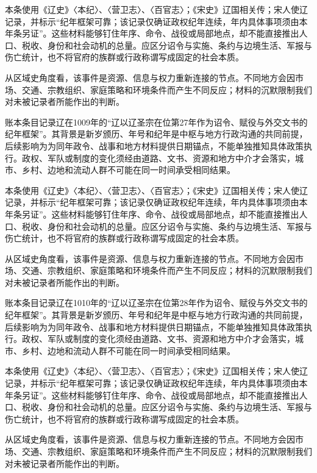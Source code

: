 本条使用《辽史》〈本纪〉、〈营卫志〉、〈百官志〉；《宋史》辽国相关传；宋人使辽记录，并标示“纪年框架可靠；该记录仅确证政权纪年连续，年内具体事项须由本年条另证”。这些材料能够钉住年序、命令、战役或局部地点，却不能直接推出人口、税收、身份和社会动机的总量。应区分诏令与实施、条约与边境生活、军报与伤亡统计，也不将官府的族群或行政称谓写成固定的社会本质。

从区域史角度看，该事件是资源、信息与权力重新连接的节点。不同地方会因市场、交通、宗教组织、家庭策略和环境条件而产生不同反应；材料的沉默限制我们对未被记录者所能作出的判断。

账本条目记录辽在1009年的“辽以辽圣宗在位第27年作为诏令、赋役与外交文书的纪年框架”。其背景是新岁颁历、年号和纪年是中枢与地方行政沟通的共同前提，后续影响为为同年政令、战事和地方材料提供日期锚点，不能单独推知具体政策执行。政权、军队或制度的变化须经由道路、文书、资源和地方中介才会落实，城市、乡村、边地和流动人群不可能在同一时间承受相同结果。

本条使用《辽史》〈本纪〉、〈营卫志〉、〈百官志〉；《宋史》辽国相关传；宋人使辽记录，并标示“纪年框架可靠；该记录仅确证政权纪年连续，年内具体事项须由本年条另证”。这些材料能够钉住年序、命令、战役或局部地点，却不能直接推出人口、税收、身份和社会动机的总量。应区分诏令与实施、条约与边境生活、军报与伤亡统计，也不将官府的族群或行政称谓写成固定的社会本质。

从区域史角度看，该事件是资源、信息与权力重新连接的节点。不同地方会因市场、交通、宗教组织、家庭策略和环境条件而产生不同反应；材料的沉默限制我们对未被记录者所能作出的判断。

账本条目记录辽在1010年的“辽以辽圣宗在位第28年作为诏令、赋役与外交文书的纪年框架”。其背景是新岁颁历、年号和纪年是中枢与地方行政沟通的共同前提，后续影响为为同年政令、战事和地方材料提供日期锚点，不能单独推知具体政策执行。政权、军队或制度的变化须经由道路、文书、资源和地方中介才会落实，城市、乡村、边地和流动人群不可能在同一时间承受相同结果。

本条使用《辽史》〈本纪〉、〈营卫志〉、〈百官志〉；《宋史》辽国相关传；宋人使辽记录，并标示“纪年框架可靠；该记录仅确证政权纪年连续，年内具体事项须由本年条另证”。这些材料能够钉住年序、命令、战役或局部地点，却不能直接推出人口、税收、身份和社会动机的总量。应区分诏令与实施、条约与边境生活、军报与伤亡统计，也不将官府的族群或行政称谓写成固定的社会本质。

从区域史角度看，该事件是资源、信息与权力重新连接的节点。不同地方会因市场、交通、宗教组织、家庭策略和环境条件而产生不同反应；材料的沉默限制我们对未被记录者所能作出的判断。

